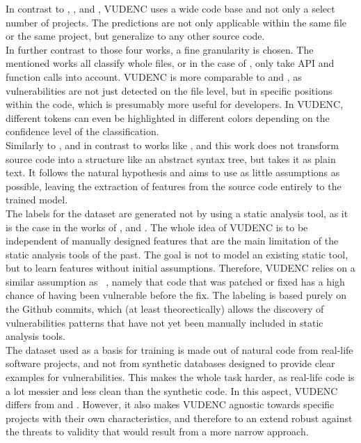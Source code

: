 \documentclass[
	a4paper,
	pagesize,
	pdftex,
	12pt,
	twoside, %
	BCOR=5mm, %
	ngerman,
	fleqn,
	final,
	]{scrartcl}
\begin{document}
In contrast to \cite{Li.2018}, \cite{Pang.2015}, \cite{Hovsepyan.2012} and \cite{Dam.2017}, VUDENC uses a wide code base and not only a select number of projects. The predictions are not only applicable within the same file or the same project, but generalize to any other source code.\\
In further contrast to those four works, a fine granularity is chosen. The mentioned works all classify whole files, or in the case of \cite{Li.2018}, only take API and function calls into account. VUDENC is more comparable to \cite{Russell.2018} and \cite{Ma.2017}, as vulnerabilities are not just detected on the file level, but in specific positions within the code, which is presumably more useful for developers. In VUDENC, different tokens can even be highlighted in different colors depending on the confidence level of the classification.\\
Similarly to \cite{Hovsepyan.2012}, and in contrast to works like \cite{Ma.2017}, \cite{Yamaguchi.2012} and \cite{Liu.2018}
this work does not transform source code into a structure like an abstract syntax tree, but takes it as plain text. It follows the natural hypothesis and aims to use as little assumptions as possible, leaving the extraction of features from the source code entirely to the trained model.\\
The labels for the dataset are generated not by using a static analysis tool, as it is the case in the works of \cite{Russell.2018}, \cite{Dam.2017} and \cite{Hovsepyan.2012}. The whole idea of VUDENC is to be independent of manually designed features that are the main limitation of the static analysis tools of the past. The goal is not to model an existing static tool, but to learn features without initial assumptions. Therefore, VUDENC relies on a similar assumption as ~\cite{Liu.2018}, namely that code that was patched or fixed has a high chance of having been vulnerable before the fix. The labeling is based purely on the Github commits, which (at least theorectically) allows the discovery of vulnerabilities patterns that have not yet been manually included in static analysis tools.\\
The dataset used as a basis for training is made out of natural code from real-life software projects, and not from synthetic databases designed to provide clear examples for vulnerabilities. This makes the whole task harder, as real-life code is a lot messier and less clean than the synthetic code. In this aspect, VUDENC differs from \cite{Russell.2018} and \cite{Li.2018}. However, it also makes VUDENC agnostic towards specific projects with their own characteristics, and therefore to an extend robust against the threats to validity that would result from a more narrow approach.\\
\end{document}
